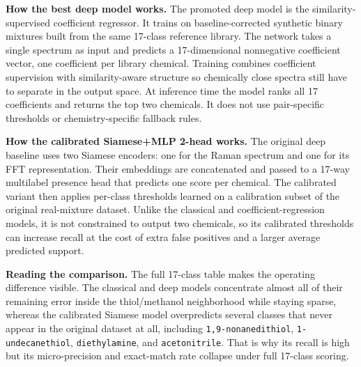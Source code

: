 \documentclass[11pt]{article}
\begin{document}
\textbf{How the best deep model works.} The promoted deep model is the similarity-supervised coefficient regressor. It trains on baseline-corrected synthetic binary mixtures built from the same 17-class reference library. The network takes a single spectrum as input and predicts a 17-dimensional nonnegative coefficient vector, one coefficient per library chemical. Training combines coefficient supervision with similarity-aware structure so chemically close spectra still have to separate in the output space. At inference time the model ranks all 17 coefficients and returns the top two chemicals. It does not use pair-specific thresholds or chemistry-specific fallback rules.

\textbf{How the calibrated Siamese+MLP 2-head works.} The original deep baseline uses two Siamese encoders: one for the Raman spectrum and one for its FFT representation. Their embeddings are concatenated and passed to a 17-way multilabel presence head that predicts one score per chemical. The calibrated variant then applies per-class thresholds learned on a calibration subset of the original real-mixture dataset. Unlike the classical and coefficient-regression models, it is not constrained to output two chemicals, so its calibrated thresholds can increase recall at the cost of extra false positives and a larger average predicted support.

\textbf{Reading the comparison.} The full 17-class table makes the operating difference visible. The classical and deep models concentrate almost all of their remaining error inside the thiol/methanol neighborhood while staying sparse, whereas the calibrated Siamese model overpredicts several classes that never appear in the original dataset at all, including \texttt{1,9-nonanedithiol}, \texttt{1-undecanethiol}, \texttt{diethylamine}, and \texttt{acetonitrile}. That is why its recall is high but its micro-precision and exact-match rate collapse under full 17-class scoring.
\end{document}
